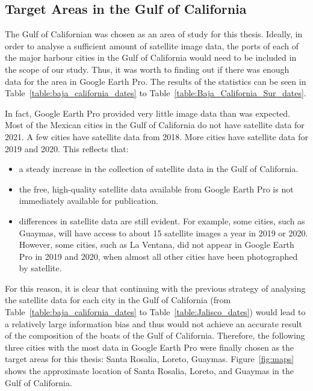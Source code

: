 \subsection{Target Areas in the Gulf of California}
\label{sec3.2.1}
The Gulf of Californian was chosen as an area of study for this thesis. Ideally, in order to analyse a sufficient amount of satellite image data, the ports of each of the major harbour cities in the Gulf of California would need to be included in the scope of our study. Thus, it was worth to finding out if there was enough data for the area in Google Earth Pro. The results of the statistics can be seen in Table~\ref{table:baja_california_dates} to  Table~\ref{table:Baja_California_Sur_dates}.

In fact, Google Earth Pro provided very little image data than was expected. Most of the Mexican cities in the Gulf of California do not have satellite data for 2021. A few cities have satellite data from 2018. More cities have satellite data for 2019 and 2020. This reflects that:
\begin{itemize}
    \item a steady increase in the collection of satellite data in the Gulf of California.
    \item the free, high-quality satellite data available from Google Earth Pro is not immediately available for publication.
    \item differences in satellite data are still evident. For example, some cities, such as Guaymas, will have access to about 15 satellite images a year in 2019 or 2020. However, some cities, such as La Ventana, did not appear in Google Earth Pro in 2019 and 2020, when almost all other cities have been photographed by satellite.
\end{itemize}

For this reason, it is clear that continuing with the previous strategy of analysing the satellite data for each city in the Gulf of California (from Table~\ref{table:baja_california_dates} to Table~\ref{table:Jalisco_dates}) would lead to a relatively large information bias and thus would not achieve an accurate result of the composition of the boats of the Gulf of California. Therefore, the following three cities with the most data in Google Earth Pro were finally chosen as the target areas for this thesis: Santa Rosalia, Loreto, Guaymas. Figure~\ref{fig:maps} shows the approximate location of Santa Rosalia, Loreto, and Guaymas in the Gulf of California.


